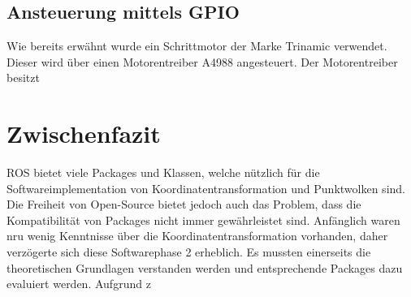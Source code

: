 \subsection {Ansteuerung mittels GPIO}
\label{subsec:Ansteuerung}
Wie bereits erwähnt wurde ein Schrittmotor der Marke Trinamic verwendet. Dieser wird über einen Motorentreiber A4988  angesteuert. Der Motorentreiber besitzt 


\section{Zwischenfazit}
\label{sec:ZwischenfazitReal}
ROS bietet viele Packages und Klassen, welche nützlich für die Softwareimplementation von Koordinatentransformation und Punktwolken sind. Die Freiheit von Open-Source bietet jedoch auch das Problem, dass die Kompatibilität von Packages nicht immer gewährleistet sind.  Anfänglich waren nru wenig Kenntnisse über die Koordinatentransformation vorhanden, daher verzögerte sich diese Softwarephase 2 erheblich. Es mussten einerseits die theoretischen Grundlagen verstanden werden und entsprechende Packages dazu evaluiert werden. Aufgrund z



